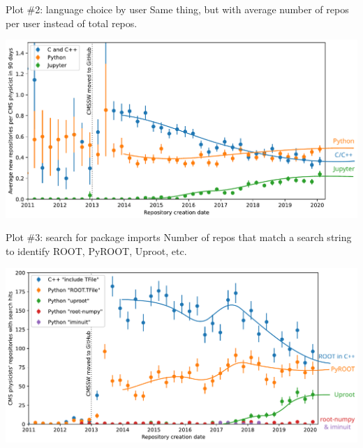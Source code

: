 \documentclass[aspectratio=169]{beamer}
\begin{document}
\begin{frame}{Plot \#2: language choice by user}
\vspace{0.25 cm}
Same thing, but with average number of repos per user instead of total repos.

\vspace{0.15 cm}
\includegraphics[width=\linewidth]{02-github-cmssw-language-byuser.pdf}
\end{frame}

\begin{frame}{Plot \#3: search for package imports}
\vspace{0.25 cm}
Number of repos that match a search string to identify ROOT, PyROOT, Uproot, etc.

\vspace{0.15 cm}
\includegraphics[width=\linewidth]{03-github-root-python.pdf}
\end{frame}
\end{document}
